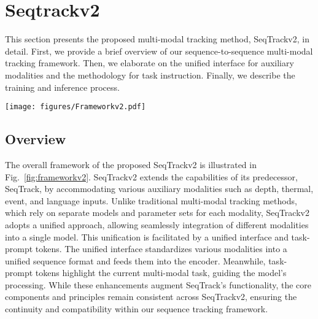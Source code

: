 \vspace{-1mm}

\section{Seqtrackv2}
\label{sec:seqtrackv2}

This section presents the proposed multi-modal tracking method, SeqTrackv2, in detail. First, we provide a brief overview of our  sequence-to-sequence multi-modal tracking framework. Then, we elaborate on the unified interface for auxiliary modalities and the methodology for task instruction. Finally, we describe the training and inference process.

\begin{figure*}[htbp]
\begin{center}
\texttt{[image: figures/Frameworkv2.pdf]}
\end{center}
\vspace{-3mm}
   \caption{Architecture of the proposed SeqTrackv2. Expanding on SeqTrack, SeqTrackv2 integrates a unified interface and task-prompt tokens. This integration consolidates diverse multi-modal tracking tasks into a unified model and parameter set. }
\vspace{-1mm}
\label{fig:frameworkv2}
\end{figure*}

\subsection{Overview}
The overall framework of the proposed SeqTrackv2 is illustrated in Fig.~\ref{fig:frameworkv2}. SeqTrackv2 extends the capabilities of its predecessor, SeqTrack, by accommodating various auxiliary modalities such as depth, thermal, event, and language inputs. Unlike traditional multi-modal tracking methods, which rely on separate models and parameter sets for each modality, SeqTrackv2 adopts a unified approach, allowing seamlessly integration of different modalities into a single model. This unification is facilitated by a unified interface and task-prompt tokens. The unified interface standardizes various modalities into a unified sequence format and feeds them into the encoder. Meanwhile, task-prompt tokens highlight the current multi-modal task, guiding the model's processing. While these enhancements augment SeqTrack's functionality, the core components and principles remain consistent across SeqTrackv2, ensuring the continuity and compatibility within our sequence tracking framework.

